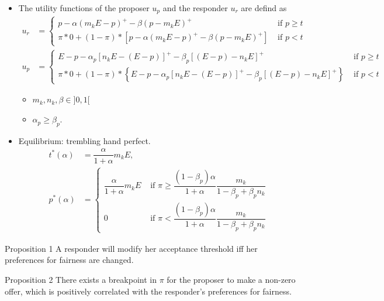 \documentclass[../root]{subfiles}
\begin{document}
    \begin{itemize}
      \item The utility functions of the proposer $u_p$ and the responder $u_r$ are defind as
      \begin{align*}
        u_r &= \begin{cases}
          p - \alpha (m_k E - p)^+ - \beta (p - m_k E)^+ & \text{ if } p \geq t \\
          \pi * 0 + (1 - \pi) * [p - \alpha (m_k E - p)^+ - \beta (p - m_k E)^+] & \text{ if } p < t
      \end{cases} \\
      u_p &= \begin{cases}
        E - p - \alpha_p [n_k E - (E - p)]^+ - \beta_p [(E - p) - n_k E]^+ & \text{ if } p \geq t \\
        \pi * 0 + (1 - \pi) * \left\{E - p - \alpha_p [n_k E - (E - p)]^+ - \beta_p [(E - p) - n_k E]^+ \right\} & \text{ if } p < t
      \end{cases}
      \end{align*}
      \begin{itemize}
        \item $m_k, n_k, \beta \in ]0, 1[$
        \item $\alpha_p \geq \beta_p$.
      \end{itemize}
      \item Equilibrium: trembling hand perfect.
      \begin{align*}
        t^*(\alpha) &= \dfrac{\alpha}{1 + \alpha}m_k E, \\
        p^*(\alpha) &= \begin{cases}
          \dfrac{\alpha}{1 + \alpha} m_k E & \text{ if } \pi \geq \dfrac{(1 - \beta_p) \alpha}{1 + \alpha}\dfrac{m_k}{1 - \beta_p + \beta_p n_k} \\
          0 &  \text{ if } \pi < \dfrac{(1 - \beta_p) \alpha}{1 + \alpha}\dfrac{m_k}{1 - \beta_p + \beta_p n_k}
      \end{cases}
      \end{align*}
    \end{itemize}

    \begin{itembox}[l]{Proposition 1}
      A responder will modify her acceptance threshold iff her preferences for fairness are changed.
    \end{itembox}

    \begin{itembox}[l]{Proposition 2}
      There exists a breakpoint in $\pi$ for the proposer to make a non-zero offer, which is positively correlated with the responder's preferences for fairness.
    \end{itembox}
\end{document}
